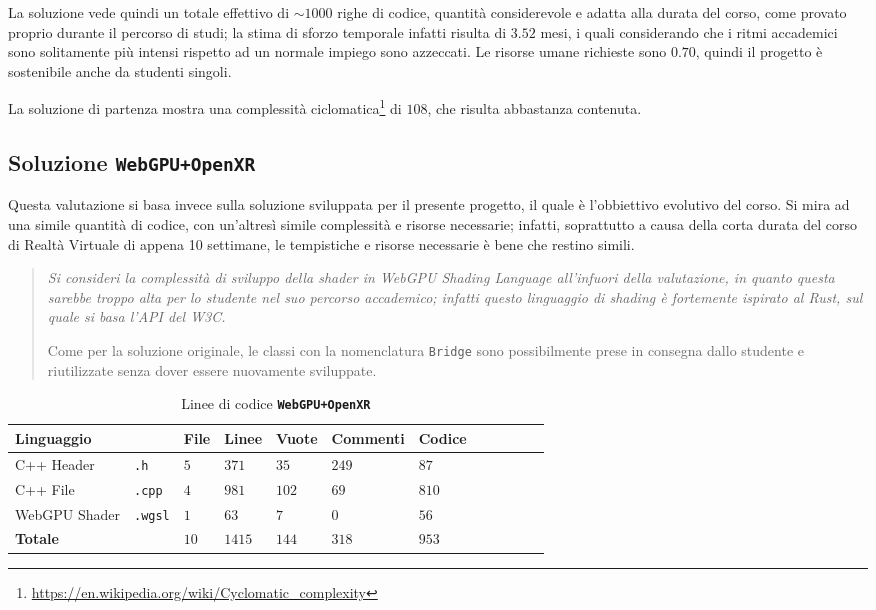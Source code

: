 \documentclass[a4paper, 11pt, twoside]{report}
\begin{document}
La soluzione vede quindi un totale effettivo di $\sim1000$ righe di codice, quantità considerevole e adatta alla durata
del corso, come provato proprio durante il percorso di studi; la stima di sforzo temporale infatti risulta di $3.52$
mesi, i quali considerando che i ritmi accademici sono solitamente più intensi rispetto ad un normale impiego sono
azzeccati. Le risorse umane richieste sono $0.70$, quindi il progetto è sostenibile anche da studenti singoli.

La soluzione di partenza mostra una complessità ciclomatica\footnote{\url{https://en.wikipedia.org/wiki/Cyclomatic\_complexity}}
di $108$, che risulta abbastanza contenuta.

\subsection{Soluzione \textcolor{violet!75}{\texttt{WebGPU+OpenXR}}}

Questa valutazione si basa invece sulla soluzione sviluppata per il presente progetto, il quale è l'obbiettivo evolutivo
del corso. Si mira ad una simile quantità di codice, con un'altresì simile complessità e risorse necessarie; infatti,
soprattutto a causa della corta durata del corso di Realtà Virtuale di appena 10 settimane, le tempistiche e risorse
necessarie è bene che restino simili.

\begin{quote}
\itshape
Si consideri la complessità di sviluppo della shader in \textit{WebGPU Shading Language} all'infuori della valutazione,
in quanto questa sarebbe troppo alta per lo studente nel suo percorso accademico; infatti questo linguaggio di shading
è fortemente ispirato al Rust, sul quale si basa l'API del W3C.

Come per la soluzione originale, le classi con la nomenclatura \texttt{Bridge} sono possibilmente prese in consegna
dallo studente e riutilizzate senza dover essere nuovamente sviluppate.
\end{quote}

\begin{table}[h]
\centering
\caption{Linee di codice \textcolor{violet!75}{\textbf{\texttt{WebGPU+OpenXR}}}}
\begin{tabular}{lp{2cm}lp{1cm}lp{2cm}lp{1cm}lp{1.3cm}lp{1cm}}
\toprule
\textbf{Linguaggio} &
                    &
\textbf{File}       &
\textbf{Linee}      &
\textbf{Vuote}      &
\textbf{Commenti}   &
\textbf{Codice}                                                          \\
\midrule
C++ Header      & \texttt{.h}    &  $5$ &  $371$ &  $35$ & $249$ &  $87$ \\
C++ File        & \texttt{.cpp}  &  $4$ &  $981$ & $102$ &  $69$ & $810$ \\
WebGPU Shader   & \texttt{.wgsl} &  $1$ &   $63$ &   $7$ &   $0$ &  $56$ \\
\midrule
\textbf{Totale} &                & $10$ & $1415$ & $144$ & $318$ &  \textcolor{violet!75}{$953$} \\
\bottomrule
\end{tabular}
\end{table}
\end{document}

